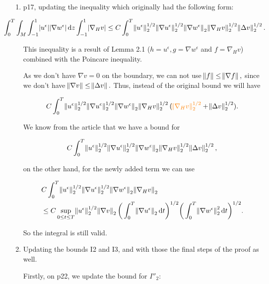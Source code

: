 \documentclass[11pt]{article}
\newcommand*\diff{\mathop{}\!\mathrm{d}}
\begin{document}
\begin{enumerate}

\item p17, updating the inequality which originally had the following form:

$$ \hspace{-1cm} \int_0 ^ T \int_M \int_{-1}^1 \abs{u^\epsilon} \abs{\nabla w^\epsilon} \diff z \int_{-1}^1 \abs{\nabla_H v} \leq C \int_0^T \norm{u^\epsilon}_2^{1/2} \norm{\nabla u^\epsilon}_2^{1/2} \norm{\nabla w^\epsilon}_2 \norm{\nabla_H v}_2^{1/2} \norm{\Delta v}_2^{1/2}.$$

This inequality is a result of Lemma 2.1 ($h= u^\epsilon, g = \nabla w^\epsilon$ and $f = \nabla_H v$) combined with the Poincare inequality.

As we don't have $\nabla v = 0$ on the boundary, we can not use $\norm{f} \leq \norm{\nabla f},$ since we don't have $\norm{\nabla v} \leq \norm{\Delta v}.$ Thus, instead of the original bound we will have

$$C \int_0^T \norm{u^\epsilon}_2^{1/2} \norm{\nabla u^\epsilon}_2^{1/2} \norm{\nabla w^\epsilon}_2 \norm{\nabla_H v}_2^{1/2} (\textcolor{orange}{\norm{\nabla_H v}_2^{1/2}} + \norm{\Delta v}_2^{1/2}).$$

We know from the article that we have a bound for

$$ C \int_0^T \norm{u^\epsilon}_2^{1/2} \norm{\nabla u^\epsilon}_2^{1/2} \norm{\nabla w^\epsilon}_2 \norm{\nabla_H v}_2^{1/2} \norm{\Delta v}_2^{1/2}, $$

on the other hand, for the newly added term we can use

\begin{equation}
  \begin{split} \nonumber
    & C \int_0^T \norm{u^\epsilon}_2^{1/2} \norm{\nabla u^\epsilon}_2^{1/2} \norm{\nabla w^\epsilon}_2 \norm{\nabla_H v}_2 \\
    & \leq C \sup_{0 \leq t \leq T} \norm{u^\epsilon}_2^{1/2} \norm{\nabla v}_2 \bigg( \int_0^T \norm{\nabla u^\epsilon}_2 \diff t \bigg)^{1/2} \bigg ( \int_0^T \norm{\nabla w^\epsilon}_2^2 \diff t \bigg)^{1/2}.
  \end{split}
\end{equation}

So the integral is still valid.

\item Updating the bounds I2 and I3, and with those the final steps of the proof as well.

Firstly, on p22, we update the bound for $I''_2:$


\end{enumerate}
\end{document}

